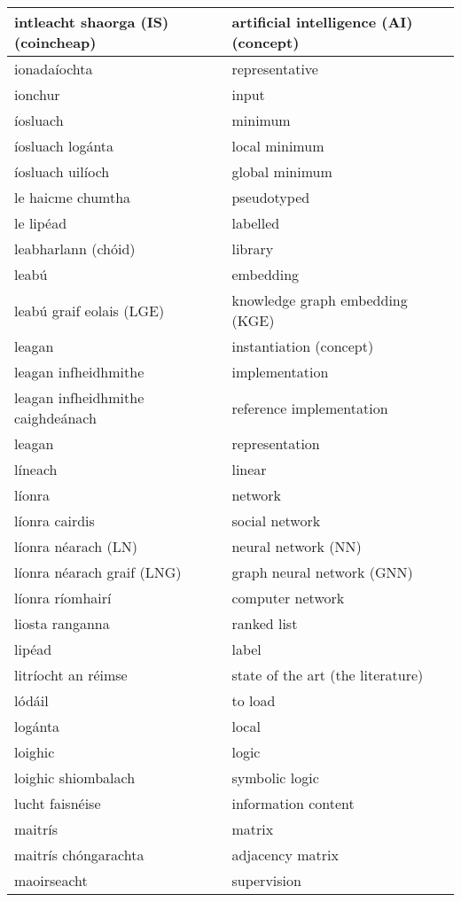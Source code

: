 \documentclass{article}
\begin{document}
\begin{longtable}{|l|l|}
		intleacht shaorga (IS) (coincheap)&artificial intelligence (AI) (concept)\\ \hline 
		ionadaíochta&representative\\ \hline 
		ionchur&input\\ \hline 
		íosluach&minimum\\ \hline 
		íosluach logánta&local minimum\\ \hline 
		íosluach uilíoch&global minimum\\ \hline 
		le haicme chumtha&pseudotyped\\ \hline 
		le lipéad&labelled\\ \hline 
		leabharlann (chóid)&library\\ \hline 
		leabú&embedding\\ \hline 
		leabú graif eolais (LGE)&knowledge graph embedding (KGE)\\ \hline 
		leagan&instantiation (concept)\\ \hline 
		leagan infheidhmithe&implementation\\ \hline 
		leagan infheidhmithe caighdeánach&reference implementation\\ \hline 
		leagan&representation\\ \hline 
		líneach&linear\\ \hline 
		líonra&network\\ \hline 
		líonra cairdis&social network\\ \hline 
		líonra néarach (LN)&neural network (NN)\\ \hline 
		líonra néarach graif (LNG)&graph neural network (GNN)\\ \hline 
		líonra ríomhairí&computer network\\ \hline 
		liosta ranganna&ranked list\\ \hline 
		lipéad&label\\ \hline 
		litríocht an réimse&state of the art (the literature)\\ \hline 
		lódáil&to load\\ \hline 
		logánta&local\\ \hline 
		loighic&logic\\ \hline 
		loighic shiombalach&symbolic logic\\ \hline 
		lucht faisnéise&information content\\ \hline 
		maitrís&matrix\\ \hline 
		maitrís chóngarachta&adjacency matrix\\ \hline 
		maoirseacht&supervision\\ \hline 

\end{longtable}
\end{document}
